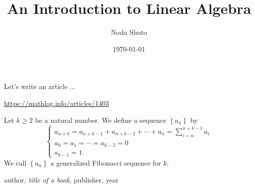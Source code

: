 \documentclass[a4paper,11pt]{book}
\begin{document}
\title{An Introduction to Linear Algebra}
\author{Noda Shuto}
\date{\today}
\maketitle
Let's write an article ...

\url{https://mathlog.info/articles/1403}

Let $ k \geq 2 $ be a natural number.
We define a sequence $ \left\{ a_n \right\} $ by
\begin{equation*}
  \begin{cases}
    a_{n+k} = a_{n+k-1} + a_{n+k-2} + \cdots + a_{n} = \displaystyle \sum_{i=n}^{n+k-1}a_{i} \\
    a_0 = a_1 = \cdots = a_{k-2} = 0 \\
    a_{k-1} = 1 .
  \end{cases}
\end{equation*}
We call $ \left\{ a_n \right\}  $ a generalized Fibonacci sequence for $ k $.  




\begin{thebibliography}{99}
 author, \emph{title of a book}, publisher, year
\end{thebibliography}
\end{document}
